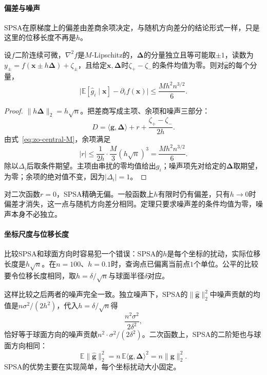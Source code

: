 \paragraph{偏差与噪声}
SPSA在原梯度上的偏差由差商余项决定，与随机方向差分的结论形式一样，只是这里的位移长度不再是$h$。

\begin{theorem}[SPSA的偏差]
\label{thm:zo-spsa}
设$f$二阶连续可微，$\nabla^2f$是$M$-Lipschitz的，$\bm{\Delta}$的分量独立且等可能取$\pm1$，读数为$y_\pm=f(\bm{x}\pm h\bm{\Delta})+\zeta_\pm$，且给定$\bm{x},\bm{\Delta}$时$\zeta_+-\zeta_-$的条件均值为零。则对$\hat{\bm{g}}$的每个分量，
\begin{equation}
 \bigl\lvert\mathbb{E}[\hat{g}_i\mid\bm{x}]-\partial_if(\bm{x})\bigr\rvert\leq\frac{M h^2n^{3/2}}{6}.
 \label{eq:zo-spsa-bias}
\end{equation}
\end{theorem}

\begin{proof}
$\lVert h\bm{\Delta}\rVert_2=h\sqrt{n}$。把差商写成主项、余项和噪声三部分：
\[
 D=\langle\bm{g},\bm{\Delta}\rangle+r+\frac{\zeta_+-\zeta_-}{2h}.
\]
由式~\eqref{eq:zo-central-M}，余项满足
\[
 \lvert r\rvert\leq\frac{1}{2h}\cdot\frac{M}{3}(h\sqrt{n})^3=\frac{Mh^2n^{3/2}}{6}.
\]
除以$\Delta_i$后取条件期望。主项由串扰的零均值给出$g_i$；噪声项先对给定的$\bm{\Delta}$取期望，为零；余项的绝对值不变，因为$\lvert\Delta_i\rvert=1$。
\end{proof}

对二次函数$r=0$，SPSA精确无偏。一般函数上$h$有限时仍有偏差，只有$h\to0$时偏差才消失，这一点与随机方向差分相同。定理只要求噪声差的条件均值为零，噪声本身不必独立。

\paragraph{坐标尺度与位移长度}
比较SPSA和球面方向时容易犯一个错误：SPSA的$h$是每个坐标的扰动，实际位移长度是$h\sqrt{n}$。在$n=100$、$h=0.1$时，查询点已偏离当前点$1$个单位。公平的比较要令位移长度相同，取$h=\delta/\sqrt{n}$与球面半径$\delta$对应。

这样比较之后两者的噪声完全一致。独立噪声下，SPSA的$\lVert\hat{\bm{g}}\rVert_2^2$中噪声贡献的均值是$n\sigma^2/(2h^2)$，代入$h=\delta/\sqrt{n}$得
\[
 \frac{n^2\sigma^2}{2\delta^2},
\]
恰好等于球面方向的噪声贡献$n^2\cdot\sigma^2/(2\delta^2)$。二次函数上，SPSA的二阶矩也与球面方向相同：
\[
 \mathbb{E}\lVert\hat{\bm{g}}\rVert_2^2=n\,\mathbb{E}\langle\bm{g},\bm{\Delta}\rangle^2=n\lVert\bm{g}\rVert_2^2.
\]
SPSA的优势主要在实现简单，每个坐标扰动大小固定。

